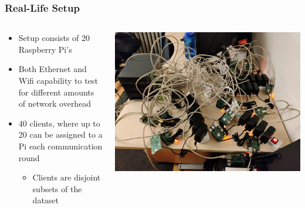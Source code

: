 \documentclass{beamer}
\begin{document}
\begin{frame}
    \frametitle{Real-Life Setup}
    \noindent
    \begin{columns}
	    \begin{column}{.5\textwidth}
		    \begin{itemize}
			    \item Setup consists of 20 Raspberry Pi's 
			    \item Both Ethernet and Wifi capability to test for different amounts of network overhead
			    \item 40 clients, where up to 20 can be assigned to a Pi each communication round
				    \begin{itemize}
					    \item Clients are disjoint subsets of the dataset
				    \end{itemize}
		    \end{itemize}    
	    \end{column}
	    \begin{column}{.5\textwidth}
		    \includegraphics[width=1\textwidth]{imgs/IMG_20220322_214443}
	    \end{column}
    \end{columns}
\end{frame}
\end{document}
